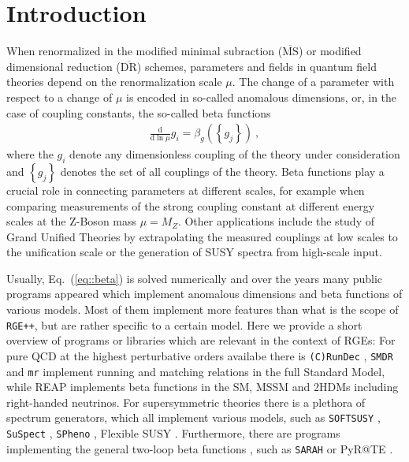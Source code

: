 \documentclass[11pt,a4paper]{article}
\begin{document}
\section{Introduction}
When renormalized in the modified minimal subraction ($\overline{\mathrm{MS}}$) or modified dimensional reduction ($\overline{\mathrm{DR}}$) schemes,
parameters and fields in quantum field theories depend on the renormalization scale $\mu$. The change of a parameter with respect to a change of $\mu$
is encoded in so-called anomalous dimensions, or, in the case of coupling constants, the so-called beta functions
\begin{align}
\frac{\mathrm{d}}{\mathrm{d}\ln\mu}g_i = \beta_g\left(\left\{g_j\right\}\right)~,
\label{eq::beta}
\end{align}
where the $g_i$ denote any dimensionless coupling of the theory under consideration and $\left\{g_j\right\}$ denotes the set of
all couplings of the theory.
Beta functions play a crucial role in connecting parameters at different scales, for example when comparing measurements of the
strong coupling constant at different energy scales at the Z-Boson mass $\mu = M_Z$. Other applications include the study of
Grand Unified Theories by extrapolating the measured couplings at low scales to the unification scale or the generation
of SUSY spectra from high-scale input.

Usually, Eq.~(\ref{eq::beta}) is solved numerically and over the years many public programs appeared which implement
anomalous dimensions and beta functions of various models. Most of them implement more features than what is the scope of \texttt{RGE++}, but are rather specific to a certain model. 
Here we provide a short overview of programs or libraries which are relevant in the context of RGEs:
For pure QCD at the highest perturbative orders availabe there is \texttt{(C)RunDec} \cite{Chetyrkin:2000yt,Schmidt:2012az,Herren:2017osy}, \texttt{SMDR} \cite{Martin:2019lqd} and \texttt{mr} \cite{Kniehl:2016enc}
implement running and matching relations in the full Standard Model,
while REAP \cite{Antusch:2005gp} implements beta functions in the SM, MSSM and 2HDMs including right-handed neutrinos. For supersymmetric theories there is a plethora of spectrum generators,
which all implement various models, such as \texttt{SOFTSUSY} \cite{Allanach:2001kg}, \texttt{SuSpect} \cite{Djouadi:2002ze}, \texttt{SPheno} \cite{Porod:2003um,Porod:2011nf}, Flexible SUSY \cite{Athron:2014yba,Athron:2017fvs}. Furthermore, there are programs implementing the general two-loop beta functions \cite{Machacek:1983tz,Machacek:1983fi,Machacek:1984zw}, such
as \texttt{SARAH} \cite{Staub:2013tta} or PyR@TE \cite{Lyonnet:2016xiz,Sartore:2020gou}.
\end{document}
